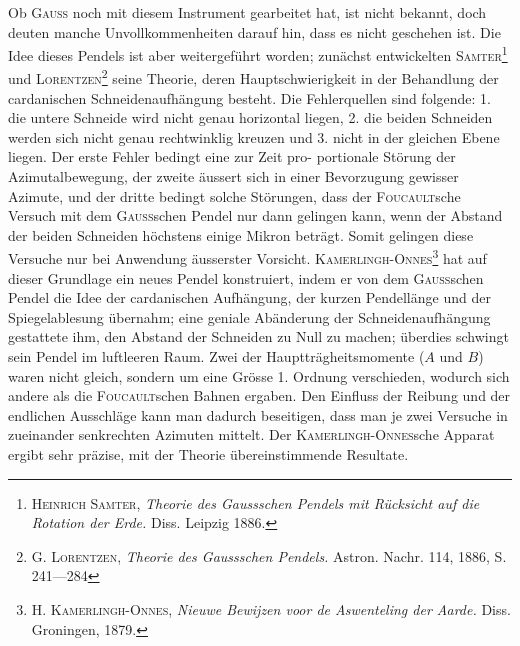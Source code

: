 Ob \textsc{Gauss} noch mit diesem Instrument gearbeitet hat, ist nicht bekannt,
doch deuten manche Unvollkommenheiten darauf hin, dass es nicht geschehen ist.
Die Idee dieses Pendels ist aber weitergeführt worden; zunächst entwickelten
\textsc{Samter}\footnote{\textsc{Heinrich Samter}, \textit{Theorie des Gaussschen Pendels mit Rücksicht auf die Rotation der Erde.}
Diss. Leipzig 1886.} und \textsc{Lorentzen}\footnote{G. \textsc{Lorentzen}, \textit{Theorie des Gaussschen Pendels.} Astron. Nachr. 114, 1886, S. 241—284} seine Theorie, deren Hauptschwierigkeit in der Behandlung
der cardanischen Schneidenaufhängung besteht. Die Fehlerquellen sind
folgende: 1. die untere Schneide wird nicht genau horizontal liegen, 2. die
beiden Schneiden werden sich nicht genau rechtwinklig kreuzen und 3. nicht
in der gleichen Ebene liegen. Der erste Fehler bedingt eine zur Zeit pro\nobreakdash-
\clearpage{}
\noindent portionale Störung der Azimutalbewegung, der zweite äussert sich in einer
Bevorzugung gewisser Azimute, und der dritte bedingt solche Störungen, dass
der \textsc{Foucault}sche Versuch mit dem \textsc{Gauss}schen Pendel nur dann gelingen
kann, wenn der Abstand der beiden Schneiden höchstens einige Mikron beträgt.
Somit gelingen diese Versuche nur bei Anwendung äusserster Vorsicht.
\textsc{Kamerlingh-Onnes}\footnote{H. \textsc{Kamerlingh-Onnes}, \textit{Nieuwe Bewijzen voor de Aswenteling der Aarde.} Diss. Groningen, 1879.} hat auf dieser Grundlage ein neues Pendel konstruiert,
indem er von dem \textsc{Gauss}schen Pendel die Idee der cardanischen Aufhängung,
der kurzen Pendellänge und der Spiegelablesung übernahm; eine geniale Abänderung
der Schneidenaufhängung gestattete ihm, den Abstand der Schneiden
zu Null zu machen; überdies schwingt sein Pendel im luftleeren Raum. Zwei
der Hauptträgheitsmomente ($A$ und $B$) waren nicht gleich, sondern um eine
Grösse 1. Ordnung verschieden, wodurch sich andere als die \textsc{Foucault}schen
Bahnen ergaben. Den Einfluss der Reibung und der endlichen Ausschläge
kann man dadurch beseitigen, dass man je zwei Versuche in zueinander senkrechten
Azimuten mittelt. Der \textsc{Kamerlingh-Onnes}sche Apparat ergibt sehr
präzise, mit der Theorie übereinstimmende Resultate.
\clearpage\endgroup

